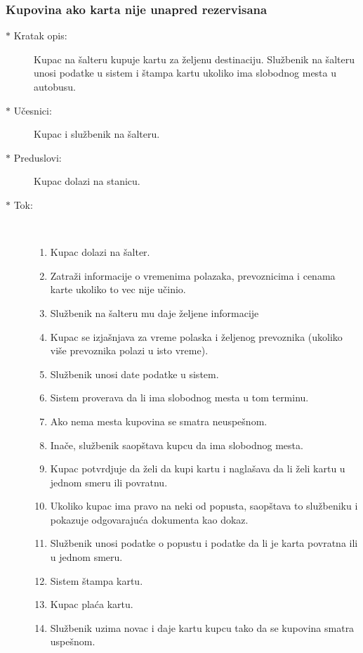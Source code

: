 \subsubsection{Kupovina ako karta nije unapred rezervisana}
\begin{description}
	\item[$\ast$ Kratak opis: ] Kupac na \v salteru kupuje kartu za \v zeljenu destinaciju. Slu\v zbenik na \v salteru unosi podatke u sistem i \v stampa kartu ukoliko ima slobodnog mesta u autobusu.
	\item[$\ast$ U\v cesnici: ] Kupac i slu\v zbenik na \v salteru.
	\item[$\ast$ Preduslovi: ] Kupac dolazi na stanicu.
	\item[$\ast$ Tok: ] \ \\
	\begin{enumerate}
		\item Kupac dolazi na \v salter.
		\item Zatra\v zi informacije o vremenima polazaka, prevoznicima i cenama karte ukoliko to vec nije u\v cinio.
		\item Slu\v zbenik na \v salteru mu daje \v zeljene informacije
		\item Kupac se izja\v snjava za vreme polaska i \v zeljenog prevoznika (ukoliko vi\v se prevoznika polazi u isto vreme).
		\item Slu\v zbenik unosi date podatke u sistem.
		\item Sistem proverava da li ima slobodnog mesta u tom terminu.
		\item Ako nema mesta kupovina se smatra neuspe\v snom.
		\item Ina\v ce, slu\v zbenik saop\v stava kupcu da ima slobodnog mesta.
		\item Kupac potvrdjuje da \v zeli da kupi kartu i nagla\v sava da li \v zeli kartu u jednom smeru ili povratnu.
		\item Ukoliko kupac ima pravo na neki od popusta, saop\v stava to slu\v zbeniku i pokazuje odgovaraju\'ca dokumenta kao dokaz.
		\item Slu\v zbenik unosi podatke o popustu i podatke da li je karta povratna ili u jednom smeru.
		\item Sistem \v stampa kartu.
		\item Kupac pla\' ca kartu.
		\item Slu\v zbenik uzima novac i daje kartu kupcu tako da se kupovina smatra uspe\v snom.
	\end{enumerate}
\end{description}

